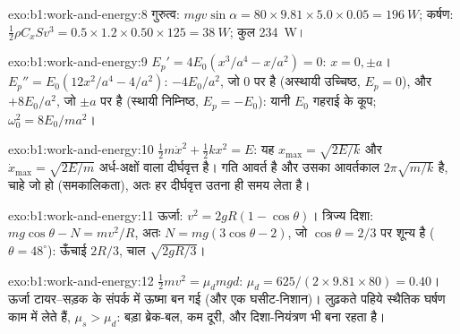 \begin{solution}{exo:b1:work-and-energy:8}
गुरुत्व: $mgv\sin\alpha = 80 \times 9.81 \times 5.0 \times 0.05 = \qty{196}{W}$;
कर्षण: $\tfrac12\rho C_xSv^3 = 0.5 \times 1.2 \times 0.50 \times 125 =
\qty{38}{W}$; कुल \qty{234}{W}।
\end{solution}

\begin{solution}{exo:b1:work-and-energy:9}
$E_p' = 4E_0(x^3/a^4 - x/a^2) = 0$: $x = 0, \pm a$। $E_p'' = E_0(12x^2/a^4 -
4/a^2)$: $-4E_0/a^2$, जो $0$ पर है (अस्थायी उच्चिष्ठ, $E_p = 0$), और $+8E_0/a^2$,
जो $\pm a$ पर है (स्थायी निम्निष्ठ, $E_p = -E_0$): यानी $E_0$ गहराई के कूप;
$\omega_0^2 = 8E_0/ma^2$।
\end{solution}

\begin{solution}{exo:b1:work-and-energy:10}
$\tfrac12 m\dot x^2 + \tfrac12 kx^2 = E$: यह $x_{\max}
= \sqrt{2E/k}$ और $\dot x_{\max} = \sqrt{2E/m}$ अर्ध-अक्षों वाला दीर्घवृत्त
है। गति आवर्त है और उसका आवर्तकाल $2\pi\sqrt{m/k}$ है,  चाहे जो हो
(समकालिकता), अतः हर दीर्घवृत्त उतना ही समय लेता है।
\end{solution}

\begin{solution}{exo:b1:work-and-energy:11}
ऊर्जा: $v^2 = 2gR(1 - \cos\theta)$। त्रिज्य दिशा: $mg\cos\theta - N = mv^2/R$,
अतः $N = mg(3\cos\theta - 2)$, जो $\cos\theta = 2/3$ पर शून्य है ($\theta =
48^\circ$): ऊँचाई $2R/3$, चाल $\sqrt{2gR/3}$।
\end{solution}

\begin{solution}{exo:b1:work-and-energy:12}
$\tfrac12 mv^2 = \mu_dmgd$: $\mu_d = 625/(2 \times 9.81 \times 80) = 0.40$।
ऊर्जा टायर--सड़क के संपर्क में ऊष्मा बन गई (और एक घसीट-निशान)। लुढ़कते
पहिये स्थैतिक घर्षण काम में लेते हैं, $\mu_s > \mu_d$: बड़ा ब्रेक-बल, कम
दूरी, और दिशा-नियंत्रण भी बना रहता है।
\end{solution}

